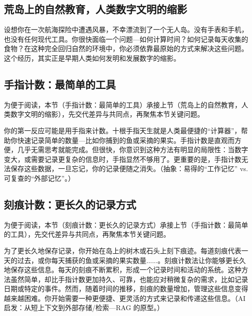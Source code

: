 \subsection{荒岛上的自然教育，人类数字文明的缩影}


设想你在一次航海探险中遭遇风暴，不幸漂流到了一个无人岛。没有手表和手机，也没有任何现代工具。你很快面临一个问题---如何计算时间？如何记录每天收集的食物？在这种完全回归自然的环境中，你必须依靠最原始的方式来解决这些问题。这个经历，其实正是早期人类如何发明和发展数字的缩影。
\subsection{手指计数：最简单的工具}


为便于阅读，本节（手指计数：最简单的工具）承接上节（荒岛上的自然教育，人类数字文明的缩影），先交代差异与共同点，再聚焦本节关键问题。

你的第一反应可能是用手指来计数。十根手指天生就是人类最便捷的“计算器”，帮助你快速记录简单的数量---比如你捕到的鱼或采摘的果实。手指计数是直观而方便，几乎无需思考就能完成。但很快，你意识到这种方法有明显的局限性：当数字变大，或需要记录更复杂的信息时，手指显然不够用了。更重要的是，手指计数无法保存这些数据，一旦忘记，你的记录便随之消失。{（抽象：易得的“工作记忆” vs. 可复查的“外部记忆”。）}
\subsection{刻痕计数：更长久的记录方式}


为便于阅读，本节（刻痕计数：更长久的记录方式）承接上节（手指计数：最简单的工具），先交代差异与共同点，再聚焦本节关键问题。

为了更长久地保存记录，你开始在岛上的树木或石头上刻下痕迹。每道刻痕代表一天的过去，或你每天捕获的鱼或采摘的果实数量......。刻痕计数法让你能够更长久地保存这些信息。每天的刻痕不断累积，形成一个记录时间和活动的系统。这种方法虽然简单，却比手指计数更加持久、可靠，也能应对稍微复杂的需求，比如记录日期或特定的事件。然而，随着时间的推移，刻痕的数量增加，管理这些信息变得越来越困难。你开始需要一种更便捷、更灵活的方式来记录和传递这些信息。{（AI 启发：从短上下文到外部存储/检索---RAG 的原型。）}
